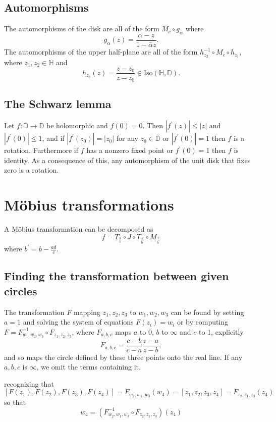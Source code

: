 \documentclass{article}
\begin{document}
\subsection{Automorphisms}
The automorphisms of the disk are all of the form $M_c \circ g_\alpha$ where
$$
  g_\alpha(z)
= \frac{\alpha - z}
       {1 - \bar{\alpha} z}.
$$
The automorphisms of the upper half-plane are all of the form
$h_{z_2}^{-1} \circ M_c \circ h_{z_1}$, where $z_1, z_2 \in
\mathbb{H}$ and
$$
  h_{z_0}(z)
= \frac{z - z_0}
       {z - \bar{z_0}}
\in \mathrm{Iso}(\mathbb{H}, \mathbb{D}).
$$

\subsection{The Schwarz lemma}
Let $f : \mathbb{D} \to \mathbb{D}$ be holomorphic and $f(0) =
0$. Then $|f^\prime(z)| \leq |z|$ and $|f^\prime(0)| \leq 1$, and if
$|f^\prime(z_0)| = |z_0|$ for any $z_0 \in \mathbb{D}$ or
$|f^\prime(0)| = 1$ then $f$ is a rotation. Furthermore if
$f$ has a nonzero fixed point or $f^\prime(0) = 1$
then $f$ is identity. As a consequence of this, any automorphism of
the unit disk that fixes zero is a rotation.

\section{M\"obius transformations}
A M\"obius transformation can be decomposed as
$$
f = T_{\frac{a}{c}} \circ J \circ T_{\frac{d}{b^\prime}} \circ M_{\frac{c}{b^\prime}}
$$
where $b^\prime = b - \frac{ad}{c}$.

\subsection{Finding the transformation between given circles}
The transformation $F$ mapping $z_1, z_2, z_3$ to $w_1, w_2, w_3$ can be
found by setting $a = 1$ and solving the system of equations $F(z_i) =
w_i$ or by computing
$F = F_{w_1, w_2, w_3}^{-1} \circ F_{z_1, z_2, z_3}$,
where $F_{a, b, c}$ maps $a$ to $0$, $b$ to $\infty$ and $c$ to 1,
explicitly
$$
  F_{a, b, c}
= \frac{c - b}
       {c - a}
  \frac{z - a}
       {z - b},
$$
and so maps the circle defined by these three points onto the real
line. If any $a, b, c$ is $\infty$, we omit the terms containing it.

recognizing that
$$
  [F(z_1), F(z_2), F(z_3), F(z_4)]
= F_{w_2, w_1, w_3}(w_4)
= [z_1, z_2, z_3, z_4]
= F_{z_2, z_1, z_3}(z_4)
$$
so that
$$
w_4 = (F_{w_2, w_1, w_3}^{-1} \circ F_{z_2, z_1, z_3})(z_4)
$$
\end{document}
